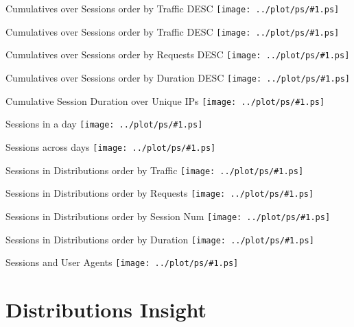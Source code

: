 \documentclass{beamer}
\newcommand\graph[1]{{\texttt{[image: ../plot/ps/\#1.ps]}}}
\begin{document}
\begin{frame}{Cumulatives over Sessions order by Traffic DESC}
\graph{session-req-traffic}
\end{frame}

\begin{frame}{Cumulatives over Sessions order by Traffic DESC}
\graph{session-req-traffic-log}
\end{frame}

\begin{frame}{Cumulatives over Sessions order by Requests DESC}
\graph{session-req-req-log}
\end{frame}

\begin{frame}{Cumulatives over Sessions order by Duration DESC}
\graph{session-req-duration-log}
\end{frame}

\begin{frame}{Cumulative Session Duration over Unique IPs}
\graph{session-int-ip}
\end{frame}

\begin{frame}{Sessions in a day}
\graph{session-daymin}
\end{frame}

\begin{frame}{Sessions across days}
\graph{session-days}
\end{frame}

\begin{frame}{Sessions in Distributions order by Traffic}
\graph{session-dist-traffic}
\end{frame}

\begin{frame}{Sessions in Distributions order by Requests}
\graph{session-dist-req}
\end{frame}

\begin{frame}{Sessions in Distributions order by Session Num}
\graph{session-dist-num}
\end{frame}

\begin{frame}{Sessions in Distributions order by Duration}
\graph{session-dist-duration}
\end{frame}

\begin{frame}{Sessions and User Agents}
\graph{session-user-agent}
\end{frame}

\section{Distributions Insight}
\end{document}
